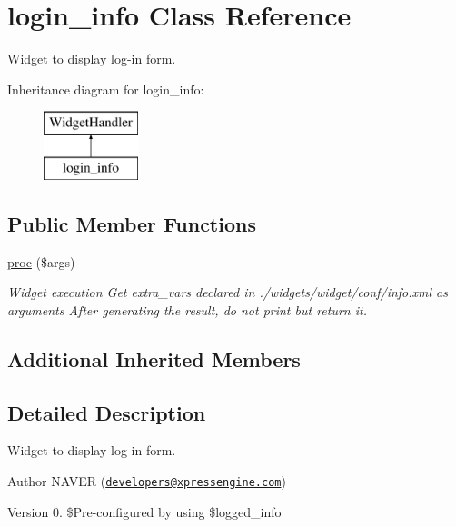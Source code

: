 \hypertarget{classlogin__info}{}\section{login\+\_\+info Class Reference}
\label{classlogin__info}


Widget to display log-\/in form.  


Inheritance diagram for login\+\_\+info\+:\begin{figure}[H]
\begin{center}
\leavevmode
\includegraphics[height=2.000000cm]{classlogin__info}
\end{center}
\end{figure}
\subsection*{Public Member Functions}
\begin{DoxyCompactItemize}
\item 
\hyperlink{classlogin__info_aae51e17272d714226674208d3bdbf18c}{proc} (\$args)
\begin{DoxyCompactList}\small\item\em Widget execution Get extra\+\_\+vars declared in ./widgets/widget/conf/info.xml as arguments After generating the result, do not print but return it. \end{DoxyCompactList}\end{DoxyCompactItemize}
\subsection*{Additional Inherited Members}


\subsection{Detailed Description}
Widget to display log-\/in form. 

\begin{DoxyAuthor}{Author}
N\+A\+V\+ER (\href{mailto:developers@xpressengine.com}{\tt developers@xpressengine.\+com}) 
\end{DoxyAuthor}
\begin{DoxyVersion}{Version}
0. \$\+Pre-\/configured by using \$logged\+\_\+info 
\end{DoxyVersion}


